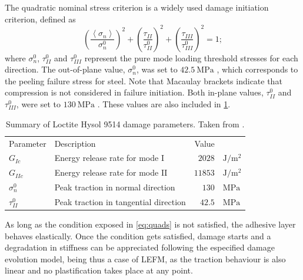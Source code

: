 \documentclass[cmfonts]{witpress}
\begin{document}
The quadratic nominal stress criterion is a widely used damage initiation criterion, defined as
\begin{equation}
\left(\frac{\left<\sigma_{n}\right>}{\sigma_{n}^{0}}\right)^{2} + \left(\frac{\tau_{II}}{\tau_{II}^{0}}\right)^{2} + \left(\frac{\tau_{III}}{\tau_{III}^{0}}\right)^{2} = 1 ;
\label{eq:quads}
\end{equation}
where $\sigma_{n}^{0}$, $\tau_{II}^{0}$ and $\tau_{III}^{0}$ represent the pure mode loading threshold stresses for each direction. The out-of-plane value, $\sigma_{n}^{0}$, was set to $\SI{42.5}{\MPa}$ \cite{Scattina2011}, which corresponds to the peeling failure stress for steel. Note that Macaulay brackets indicate that compression is not considered in failure initiation. Both in-plane values, $\tau_{II}^{0}$ and $\tau_{III}^{0}$, were set to $\SI{130}{\MPa}$ \cite{Scattina2011}. These values are also included in \cref{tab:ads_dmg_params}. %

\begin{table}
	\centering
	\begin{tabular}{llrl}

		

		Parameter & Description & Value & \\

		

		$G_{Ic}$ & Energy release rate for mode I & $\num{2028}$ & $\si{\J/\m^2}$ \\
		$G_{IIc}$ & Energy release rate for mode II & $\num{11853}$ & $\si{\J/\m^2}$ \\
		$\sigma_{n}^{0}$ & Peak traction in normal direction & $\num{130}$ & $\si{\MPa}$ \\
		$\tau_{II}^{0}$ & Peak traction in tangential direction & $\num{42.5}$ & $\si{\MPa}$ \\

		

	\end{tabular}
	\caption[Summary of Loctite Hysol 9514 damage parameters.]{Summary of Loctite Hysol 9514 damage parameters. Taken from \cite{Scattina2011}.}
	\label{tab:ads_dmg_params}
\end{table}

As long as the condition exposed in \cref{eq:quads} is not satisfied, the adhesive layer behaves elastically. Once the condition gets satisfied, damage starts and a degradation in stiffness can be appreciated following the especified damage evolution model, being thus a case of LEFM, as the traction behaviour is also linear and no plastification takes place at any point.
\end{document}
